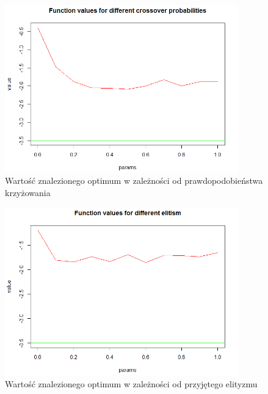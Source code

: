 \documentclass[11pt, a4paper]{article}
\begin{document}
\begin{figure}[H]
	\begin{center}
		\includegraphics[width=0.9\textwidth]{./assets/Zeldasine3.png} %
		\caption{Wartość znalezionego optimum w zależności od prawdopodobieństwa krzyżowania}
		\label{fig:zeldasine3}
	\end{center}
\end{figure}

\begin{figure}[H]
	\begin{center}
		\includegraphics[width=0.9\textwidth]{./assets/Zeldasine4.png} %
		\caption{Wartość znalezionego optimum w zależności od przyjętego elityzmu}
		\label{fig:zeldasine4}
	\end{center}
\end{figure}
\end{document}
